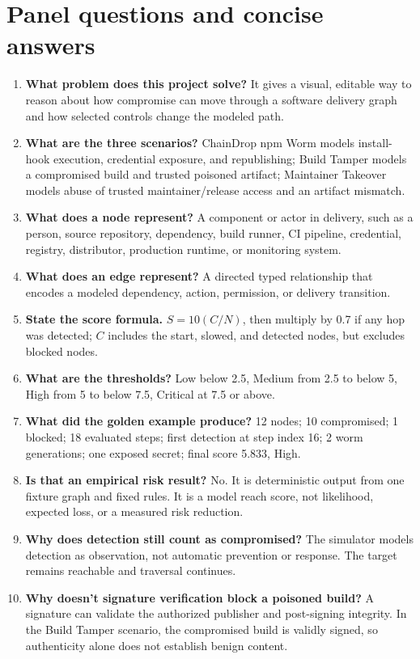 \documentclass[11pt,oneside]{book}
\begin{document}
\chapter{Panel questions and concise answers}
\begin{enumerate}
\item \textbf{What problem does this project solve?} It gives a visual, editable way to reason about how compromise can move through a software delivery graph and how selected controls change the modeled path.
\item \textbf{What are the three scenarios?} ChainDrop npm Worm models install-hook execution, credential exposure, and republishing; Build Tamper models a compromised build and trusted poisoned artifact; Maintainer Takeover models abuse of trusted maintainer/release access and an artifact mismatch.
\item \textbf{What does a node represent?} A component or actor in delivery, such as a person, source repository, dependency, build runner, CI pipeline, credential, registry, distributor, production runtime, or monitoring system.
\item \textbf{What does an edge represent?} A directed typed relationship that encodes a modeled dependency, action, permission, or delivery transition.
\item \textbf{State the score formula.} $S=10(C/N)$, then multiply by 0.7 if any hop was detected; $C$ includes the start, slowed, and detected nodes, but excludes blocked nodes.
\item \textbf{What are the thresholds?} Low below 2.5, Medium from 2.5 to below 5, High from 5 to below 7.5, Critical at 7.5 or above.
\item \textbf{What did the golden example produce?} 12 nodes; 10 compromised; 1 blocked; 18 evaluated steps; first detection at step index 16; 2 worm generations; one exposed secret; final score 5.833, High.
\item \textbf{Is that an empirical risk result?} No. It is deterministic output from one fixture graph and fixed rules. It is a model reach score, not likelihood, expected loss, or a measured risk reduction.
\item \textbf{Why does detection still count as compromised?} The simulator models detection as observation, not automatic prevention or response. The target remains reachable and traversal continues.
\item \textbf{Why doesn't signature verification block a poisoned build?} A signature can validate the authorized publisher and post-signing integrity. In the Build Tamper scenario, the compromised build is validly signed, so authenticity alone does not establish benign content.

\end{enumerate}
\end{document}
